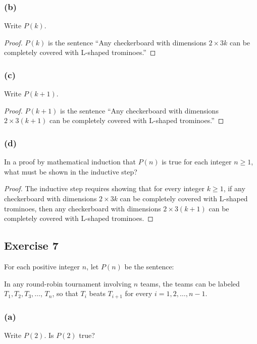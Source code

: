 \documentclass[14pt]{extarticle}
\begin{document}
\subsubsection{(b)}
Write $P(k)$.

\begin{proof}
    $P(k)$ is the sentence “Any checkerboard with dimensions $2 \times 3k$ can be completely covered with L-shaped trominoes.”

\end{proof}

\subsubsection{(c)}
Write $P(k + 1)$.

\begin{proof}
    $P(k + 1)$ is the sentence “Any checkerboard with dimensions $2 \times 3(k + 1)$ can be completely covered with L-shaped trominoes.”
\end{proof}

\subsubsection{(d)}
In a proof by mathematical induction that $P(n)$ is true for each integer $n \geq 1$, what must be shown in the inductive step?

\begin{proof}
    The inductive step requires showing that for every integer $k \geq 1$, if any checkerboard with dimensions $2 \times 3k$ can be completely covered with L-shaped trominoes, then any checkerboard with dimensions $2 \times 3(k + 1)$ can be completely covered with L-shaped trominoes.
\end{proof}

\subsection{Exercise 7}
For each positive integer $n$, let $P(n)$ be the sentence:

In any round-robin tournament involving $n$ teams, the teams can be labeled $T_1, T_2, T_3, \ldots$, $T_n$, so that $T_i$ beats $T_{i + 1}$ for every $i = 1, 2, \ldots, n - 1$.

\subsubsection{(a)}
Write $P(2)$. Is $P(2)$ true?
\end{document}
